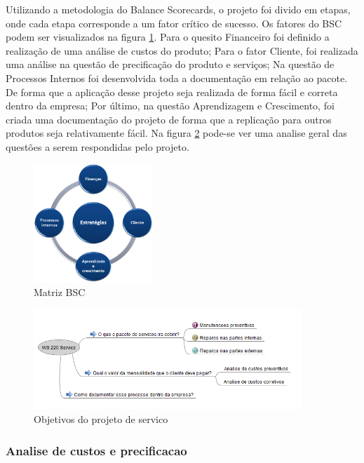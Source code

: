 \documentclass[12pt]{article}
\begin{document}
	Utilizando a metodologia do Balance Scorecards, o projeto foi divido em etapas, onde cada etapa corresponde a um fator crítico de sucesso. Os fatores do BSC podem ser visualizados na figura \ref{fig:bsc}. Para o quesito Financeiro foi definido a realização de uma análise de custos do produto; Para o fator Cliente, foi realizada uma análise na questão de precificação do produto e serviços; Na questão de Processos Internos foi desenvolvida toda a documentação em relação ao pacote. De forma que a aplicação desse projeto seja realizada de forma fácil e correta dentro da empresa; Por último, na questão Aprendizagem e Crescimento, foi criada uma documentação do projeto de forma que a replicação para outros produtos seja relativamente fácil. Na figura \ref{fig:service} pode-se ver uma analise geral das questões a serem respondidas pelo projeto.

\begin{figure}[h!]
	\centering
	\includegraphics[width=0.4\textwidth]{img/bsc.png}
	\caption{Matriz BSC}
	\label{fig:bsc}
\end{figure}

\begin{figure}[h!]
	\centering
	\includegraphics[width=0.9\textwidth]{img/ws220.png}
	\caption{Objetivos do projeto de servico}
	\label{fig:service}
\end{figure}

\subsubsection{Analise de custos e precificacao}
\end{document}
